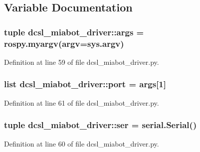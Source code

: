 \subsection{\-Variable \-Documentation}
\subsubsection[{args}]{\setlength{\rightskip}{0pt plus 5cm}tuple {\bf dcsl\-\_\-miabot\-\_\-driver\-::args} = rospy.\-myargv(argv=sys.\-argv)}\label{namespacedcsl__miabot__driver_a31a156cd9a87f125b3e14aa825939b3b}


\-Definition at line 59 of file dcsl\-\_\-miabot\-\_\-driver.\-py.

\subsubsection[{port}]{\setlength{\rightskip}{0pt plus 5cm}list {\bf dcsl\-\_\-miabot\-\_\-driver\-::port} = {\bf args}[1]}\label{namespacedcsl__miabot__driver_abe664adeba2a40e7e5d7d6f7f15a58dc}


\-Definition at line 61 of file dcsl\-\_\-miabot\-\_\-driver.\-py.

\subsubsection[{ser}]{\setlength{\rightskip}{0pt plus 5cm}tuple {\bf dcsl\-\_\-miabot\-\_\-driver\-::ser} = serial.\-Serial()}\label{namespacedcsl__miabot__driver_ade41a1f1873c44b13df2ec1d60e79865}


\-Definition at line 60 of file dcsl\-\_\-miabot\-\_\-driver.\-py.

